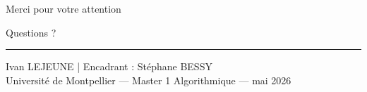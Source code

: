\begin{frame}[plain]
  \vspace{2cm}
  \begin{center}
    {\Huge \color{umblue} Merci pour votre attention}

    \bigskip
    {\large Questions ?}

    \vspace{1.5cm}
    \hrule
    \medskip
    {\small Ivan LEJEUNE \quad | \quad Encadrant : St\'ephane BESSY}\\
    {\small Universit\'e de Montpellier --- Master 1 Algorithmique --- mai 2026}
  \end{center}
\end{frame}

